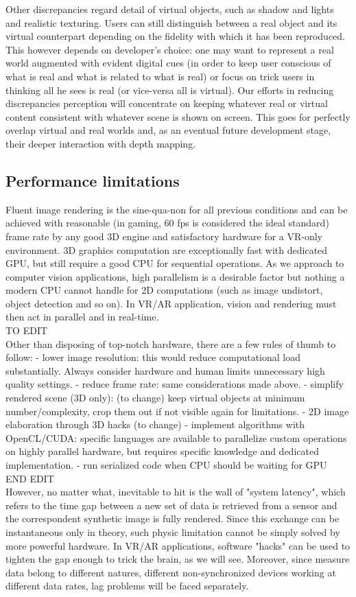 Other discrepancies regard detail of virtual objects, such as shadow and lights and realistic texturing. Users can still distinguish between a real object and its virtual counterpart depending on the fidelity with which it has been reproduced. This however depends on developer's choice: one may want to represent a real world augmented with evident digital cues (in order to keep user conscious of what is real and what is related to what is real) or focus on trick users in thinking all he sees is real (or vice-versa all is virtual). Our efforts in reducing discrepancies perception will concentrate on keeping whatever real or virtual content consistent with whatever scene is shown on screen. This goes for perfectly overlap virtual and real worlds and, as an eventual future development stage, their deeper interaction with depth mapping.

\subsection{Performance limitations}
Fluent image rendering is the sine-qua-non for all previous conditions and can be achieved with reasonable (in gaming, 60 fps is considered the ideal standard) frame rate by any good 3D engine and satisfactory hardware for a VR-only environment. 3D graphics computation are exceptionally fast with dedicated GPU, but still require a good CPU for sequential operations. As we approach to computer vision applications, high parallelism is a desirable factor but nothing a modern CPU cannot handle for 2D computations (such as image undistort, object detection and so on). In VR/AR application, vision and rendering must then act in parallel and in real-time.\\
TO EDIT\\
Other than disposing of top-notch hardware, there are a few rules of thumb to follow:
- lower image resolution: this would reduce computational load substantially. Always consider hardware and human limits unnecessary high quality settings.
- reduce frame rate: same considerations made above.
- simplify rendered scene (3D only): (to change) keep virtual objects at minimum number/complexity, crop them out if not visible again for limitations.
- 2D image elaboration through 3D hacks (to change)
- implement algorithms with OpenCL/CUDA: specific languages are available to parallelize custom operations on highly parallel hardware, but requires specific knowledge and dedicated implementation.
- run serialized code when CPU should be waiting for GPU\\
END EDIT\\
However, no matter what, inevitable to hit is the wall of "system latency", which refers to the time gap between a new set of data is retrieved from a sensor and the correspondent synthetic image is fully rendered. Since this exchange can be instantaneous only in theory, such physic limitation cannot be simply solved by more powerful hardware. In VR/AR applications, software "hacks" can be used to tighten the gap enough to trick the brain, as we will see. Moreover, since measure data belong to different natures, different non-synchronized devices working at different data rates, lag problems will be faced separately. 

